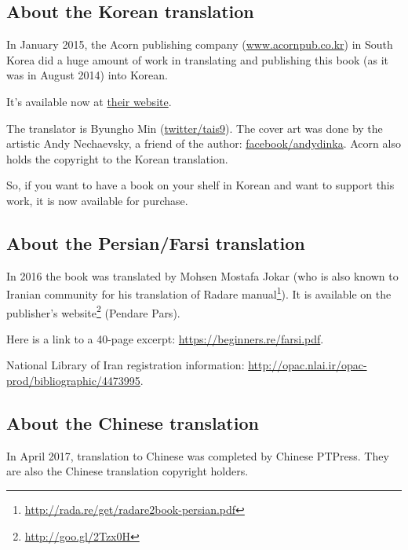 



\subsection*{About the Korean translation}

In January 2015, the Acorn publishing company (\href{http://www.acornpub.co.kr}{www.acornpub.co.kr}) in South Korea did a huge amount of work in translating and publishing
this book (as it was in August 2014) into Korean.

It's available now at \href{http://go.yurichev.com/17343}{their website}.

\iffalse
\begin{figure}[H]
\centering
\texttt{[image: acorn\_cover.jpg]}
\end{figure}
\fi

The translator is Byungho Min (\href{http://go.yurichev.com/17344}{twitter/tais9}).
The cover art was done by the artistic Andy Nechaevsky, a friend of the author:
\href{http://go.yurichev.com/17023}{facebook/andydinka}.
Acorn also holds the copyright to the Korean translation.

So, if you want to have a  book on your shelf in Korean and
want to support this work, it is now available for purchase.

\subsection*{About the Persian/Farsi translation}

In 2016 the book was translated by Mohsen Mostafa Jokar (who is also known to Iranian community for his translation of Radare manual\footnote{\url{http://rada.re/get/radare2book-persian.pdf}}).
It is available on the publisher’s website\footnote{\url{http://goo.gl/2Tzx0H}} (Pendare Pars).

Here is a link to a 40-page excerpt: \url{https://beginners.re/farsi.pdf}.

National Library of Iran registration information: \url{http://opac.nlai.ir/opac-prod/bibliographic/4473995}.

\subsection*{About the Chinese translation}

In April 2017, translation to Chinese was completed by Chinese PTPress. They are also the Chinese translation copyright holders.


